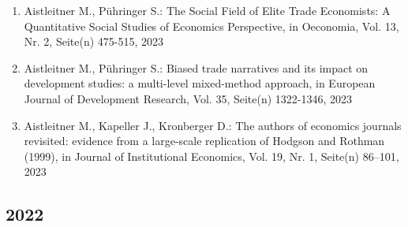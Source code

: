 \begin{enumerate}
	 \item Aistleitner M., Pühringer S.: The Social Field of Elite Trade Economists: A Quantitative Social Studies of Economics Perspective, in Oeconomia, Vol. 13, Nr. 2, Seite(n) 475-515, 2023
	 \item Aistleitner M., Pühringer S.: Biased trade narratives and its impact on development studies: a multi-level mixed-method approach, in European Journal of Development Research, Vol. 35, Seite(n) 1322-1346, 2023
	 \item Aistleitner M., Kapeller J., Kronberger D.: The authors of economics journals revisited: evidence from a large-scale replication of Hodgson and Rothman (1999), in Journal of Institutional Economics, Vol. 19, Nr. 1, Seite(n) 86–101, 2023
\end{enumerate}
\subsection*{2022}
